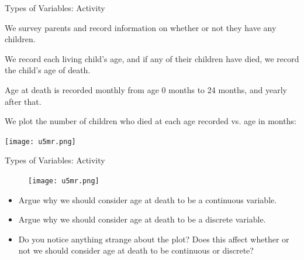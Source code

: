 \documentclass[10pt,t]{beamer}
\begin{document}
\begin{frame}{Types of Variables: Activity}

\vspace{-5 mm}

We survey parents and record information on whether or not they have any children. 
\medskip

We record each living child's age, and if any of their children have died, we record the child's age of death. 
\medskip

Age at death is recorded monthly from age 0 months to 24 months, and yearly after that. 
\medskip

We plot the number of children who died at each age recorded vs. age in months:

\vspace{0.3cm}

\centering \texttt{[image: u5mr.png]}
\end{frame}

\begin{frame}{Types of Variables: Activity}

\vspace{-5 mm}

\begin{figure}
	\centering \texttt{[image: u5mr.png]}
\end{figure}
	
\vspace{0.1cm}

\begin{itemize}
	\item Argue why we should consider age at death to be a continuous variable.
	\item Argue why we should consider age at death to be a discrete variable.
	\item Do you notice anything strange about the plot? Does this affect whether or not we should consider age at death to be continuous or discrete?
\end{itemize}

\end{frame}
\end{document}
